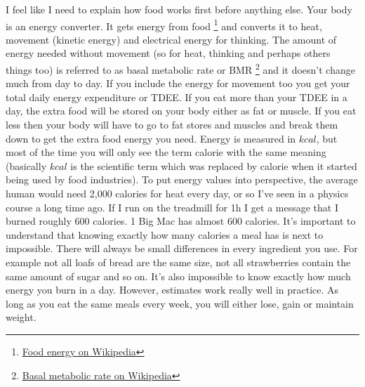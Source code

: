 \documentclass[openany, 12pt]{book}
\begin{document}
	I feel like I need to explain how food works first before anything else. Your body is an energy converter. It gets energy from food
        \footnote{\href{https://en.wikipedia.org/wiki/Food_energy}{Food energy on Wikipedia}} and converts it to heat, movement (kinetic energy) and 
	electrical energy for thinking. The amount of energy needed without movement (so for heat, thinking and perhaps others things too) is referred 
	to as basal metabolic rate or BMR
        \footnote{\href{https://en.wikipedia.org/wiki/Basal_metabolic_rate}{Basal metabolic rate on Wikipedia}} and it
	doesn't change much from day to day. If you include the energy for movement too you get your total daily energy expenditure or TDEE. If you eat
	more than your TDEE in a day, the extra food will be stored on your body either as fat or muscle. If you eat less then your body will have to go
	to fat stores and muscles and break them down to get the extra food energy you need. Energy is measured in $kcal$, but most of the time you will
	only see the term calorie with the same meaning (basically $kcal$ is the scientific term which was replaced by calorie when it started being used
	by food industries). To put energy values into perspective, the average human would need 2,000 calories for heat every day, or so I've seen in a
	physics course a long time ago. If I run on the treadmill for 1h I get a message that I burned roughly 600 calories. 1 Big Mac has almost 600 calories.
        It's important to understand that knowing exactly how many calories a meal has is next to impossible. There will always be small differences in every
        ingredient you use. For example not all loafs of bread are the same size, not all strawberries contain the same amount of sugar and so on. It's also
        impossible to know exactly how much energy you burn in a day. However, estimates work really well in practice. As long as you eat the same meals every week,
        you will either lose, gain or maintain weight.
	
\end{document}
